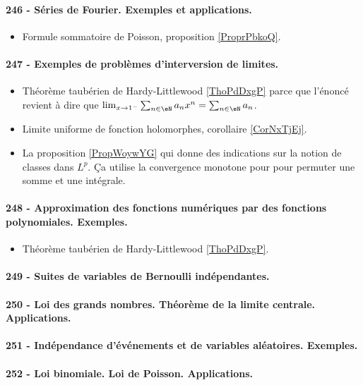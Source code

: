 \paragraph{246 - Séries de Fourier. Exemples et applications.}
\begin{itemize}
    \item Formule sommatoire de Poisson, proposition \ref{ProprPbkoQ}.
\end{itemize}
\paragraph{247 - Exemples de problèmes d’interversion de limites.}
\begin{itemize}
    \item Théorème taubérien de Hardy-Littlewood \ref{ThoPdDxgP} parce que l'énoncé revient à dire que \( \lim_{x\to 1^-} \sum_{n\in \eN}a_nx^n=\sum_{n\in \eN}a_n\).
    \item Limite uniforme de fonction holomorphes, corollaire \ref{CorNxTjEj}.
    \item La proposition \ref{PropWoywYG} qui donne des indications sur la notion de classes dans \( L^p\). Ça utilise la convergence monotone pour  pour permuter une somme et une intégrale.
\end{itemize}
\paragraph{248 - Approximation des fonctions numériques par des fonctions polynomiales. Exemples.}
\begin{itemize}
    \item Théorème taubérien de Hardy-Littlewood \ref{ThoPdDxgP}.
\end{itemize}
\paragraph{249 - Suites de variables de Bernoulli indépendantes.}
\paragraph{250 - Loi des grands nombres. Théorème de la limite centrale. Applications.}
\paragraph{251 - Indépendance d’événements et de variables aléatoires. Exemples.}
\paragraph{252 - Loi binomiale. Loi de Poisson. Applications.}
